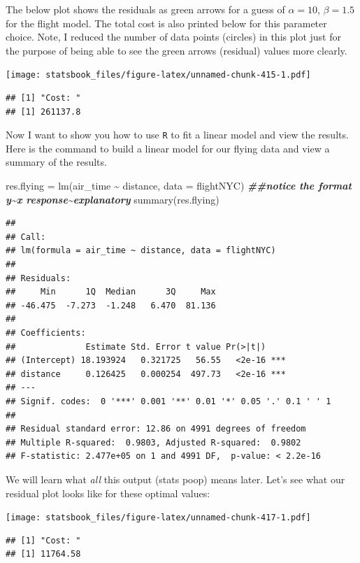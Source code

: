 \documentclass[
]{book}
\newenvironment{Shaded}{\begin{snugshade}}{\end{snugshade}}
\newcommand{\AttributeTok}[1]{\textcolor[rgb]{0.77,0.63,0.00}{#1}}
\newcommand{\DocumentationTok}[1]{\textcolor[rgb]{0.56,0.35,0.01}{\textbf{\textit{#1}}}}
\newcommand{\FunctionTok}[1]{\textcolor[rgb]{0.00,0.00,0.00}{#1}}
\newcommand{\NormalTok}[1]{#1}
\newcommand{\OtherTok}[1]{\textcolor[rgb]{0.56,0.35,0.01}{#1}}
\newcommand{\SpecialCharTok}[1]{\textcolor[rgb]{0.00,0.00,0.00}{#1}}
\theoremstyle{definition}
\theoremstyle{definition}
\theoremstyle{definition}
\theoremstyle{definition}
\theoremstyle{remark}
\begin{document}
The below plot shows the residuals as green arrows for a guess of \(\alpha=10\), \(\beta=1.5\) for the flight model. The total cost is also printed below for this parameter choice. Note, I reduced the number of data points (circles) in this plot just for the purpose of being able to see the green arrows (residual) values more clearly.

\texttt{[image: statsbook\_files/figure-latex/unnamed-chunk-415-1.pdf]}

\begin{verbatim}
## [1] "Cost: "
## [1] 261137.8
\end{verbatim}

Now I want to show you how to use \texttt{R} to fit a linear model and view the results. Here is the command to build a linear model for our flying data and view a summary of the results.

\begin{Shaded}
\begin{Highlighting}[]
\NormalTok{res.flying }\OtherTok{=} \FunctionTok{lm}\NormalTok{(air\_time }\SpecialCharTok{\textasciitilde{}}\NormalTok{ distance, }\AttributeTok{data =}\NormalTok{ flightNYC)  }\DocumentationTok{\#\#notice the format y\textasciitilde{}x response\textasciitilde{}explanatory}
\FunctionTok{summary}\NormalTok{(res.flying)}
\end{Highlighting}
\end{Shaded}

\begin{verbatim}
## 
## Call:
## lm(formula = air_time ~ distance, data = flightNYC)
## 
## Residuals:
##     Min      1Q  Median      3Q     Max 
## -46.475  -7.273  -1.248   6.470  81.136 
## 
## Coefficients:
##              Estimate Std. Error t value Pr(>|t|)    
## (Intercept) 18.193924   0.321725   56.55   <2e-16 ***
## distance     0.126425   0.000254  497.73   <2e-16 ***
## ---
## Signif. codes:  0 '***' 0.001 '**' 0.01 '*' 0.05 '.' 0.1 ' ' 1
## 
## Residual standard error: 12.86 on 4991 degrees of freedom
## Multiple R-squared:  0.9803, Adjusted R-squared:  0.9802 
## F-statistic: 2.477e+05 on 1 and 4991 DF,  p-value: < 2.2e-16
\end{verbatim}

We will learn what \emph{all} this output (stats poop) means later. Let's see what our residual plot looks like for these optimal values:

\texttt{[image: statsbook\_files/figure-latex/unnamed-chunk-417-1.pdf]}

\begin{verbatim}
## [1] "Cost: "
## [1] 11764.58
\end{verbatim}
\end{document}
